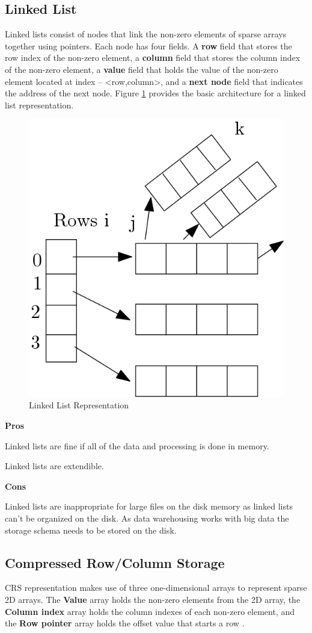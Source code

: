 \subsection{Linked List}
Linked lists  consist of nodes that link the non-zero elements of sparse arrays together using pointers. Each node has four fields. A \textbf{row} field that stores the row index of the non-zero element, a \textbf{column} field that stores the column index of the non-zero element, a \textbf{value} field that holds the value of the non-zero element located at index – <row,column>, and a \textbf{next node} field that indicates the address of the next node. Figure \ref{fig:linkedList} provides the basic architecture for a linked list representation.

 \begin{figure}[H]
	\centering
	\includegraphics[width=0.3\linewidth]{LinkedList}
	\caption{Linked List Representation}
	\label{fig:linkedList}
\end{figure}

\textbf{Pros}
\begin{compactitem}
	\item Linked lists are fine if all of the data and processing is done in memory.
	\item Linked lists are extendible.
\end{compactitem}

\textbf{Cons}
\begin{compactitem}
	\item Linked lists are inappropriate for large files on the disk memory as linked lists can't be organized on the disk. As data warehousing works with big data the storage schema needs to be stored on the disk. 
\end{compactitem}

\subsection{Compressed Row/Column Storage}

 CRS representation makes use of three one-dimensional arrays to represent sparse 2D arrays. The \textbf{Value} array holds the non-zero elements from the 2D array, the \textbf{Column index} array holds the column indexes of each non-zero element, and the \textbf{Row pointer} array holds the offset value that starts a row \cite{wang:2014sar}.
 
